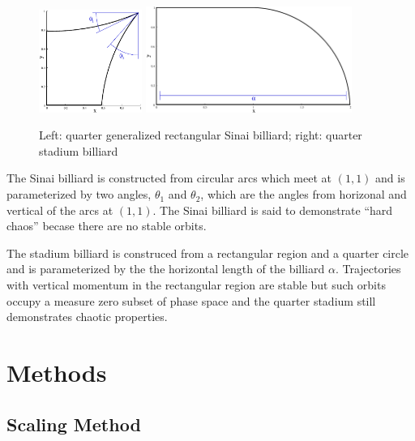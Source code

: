\documentclass{report}
\begin{document}
\begin{figure}[h!]
  \begin{center}
    \includegraphics[width=0.3\textwidth]{figs/domains/qugrs_fig.eps}
    \includegraphics[width=0.6\textwidth]{figs/domains/qust_fig.eps}
    \caption{Left: quarter generalized rectangular Sinai billiard; right: quarter stadium billiard}
    \label{fig:billiards}
  \end{center}
\end{figure}

The Sinai billiard is constructed from circular arcs which meet at $(1,1)$ and is parameterized by two angles, $\theta_{1}$ and $\theta_{2}$, which are the angles from horizonal and vertical of the arcs at $(1,1)$. The Sinai billiard is said to demonstrate ``hard chaos'' becase there are no stable orbits.

The stadium billiard is construced from a rectangular region and a quarter circle and is parameterized by the the horizontal length of the billiard $\alpha$. Trajectories with vertical momentum in the rectangular region are stable but such orbits occupy a measure zero subset of phase space and the quarter stadium still demonstrates chaotic properties.


\chapter{Methods}
\section{Scaling Method}
\end{document}

